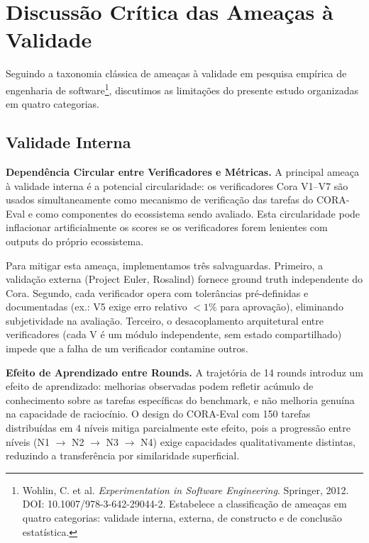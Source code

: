 \section{Discussão Crítica das Ameaças à Validade}

Seguindo a taxonomia clássica de ameaças à validade em pesquisa empírica
de engenharia de software\footnote{Wohlin, C. et al. \textit{Experimentation
in Software Engineering}. Springer, 2012. DOI:
10.1007/978-3-642-29044-2. Estabelece a classificação de ameaças em
quatro categorias: validade interna, externa, de constructo e de
conclusão estatística.}, discutimos as limitações do presente estudo
organizadas em quatro categorias.

\subsection{Validade Interna}

\textbf{Dependência Circular entre Verificadores e Métricas.} A principal
ameaça à validade interna é a potencial circularidade: os verificadores
Cora V1--V7 são usados simultaneamente como mecanismo de verificação das
tarefas do CORA-Eval e como componentes do ecossistema sendo avaliado.
Esta circularidade pode inflacionar artificialmente os scores se os
verificadores forem lenientes com outputs do próprio ecossistema.

Para mitigar esta ameaça, implementamos três salvaguardas. Primeiro, a
validação externa (Project Euler, Rosalind) fornece ground truth
independente do Cora. Segundo, cada verificador opera com tolerâncias
pré-definidas e documentadas (ex.: V5 exige erro relativo $< 1\%$ para
aprovação), eliminando subjetividade na avaliação. Terceiro, o
desacoplamento arquitetural entre verificadores (cada V é um módulo
independente, sem estado compartilhado) impede que a falha de um
verificador contamine outros.

\textbf{Efeito de Aprendizado entre Rounds.} A trajetória de 14 rounds
introduz um efeito de aprendizado: melhorias observadas podem refletir
acúmulo de conhecimento sobre as tarefas específicas do benchmark, e não
melhoria genuína na capacidade de raciocínio. O design do CORA-Eval com
150 tarefas distribuídas em 4 níveis mitiga parcialmente este efeito,
pois a progressão entre níveis (N1 $\rightarrow$ N2 $\rightarrow$ N3
$\rightarrow$ N4) exige capacidades qualitativamente distintas,
reduzindo a transferência por similaridade superficial.

